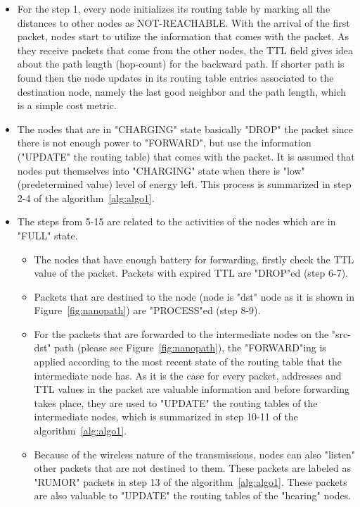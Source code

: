 \documentclass[12pt, oneandhalf, chaparabic, sees, ms]{metu}
\begin{document}
\newpage
\begin{itemize}
\setlength\itemsep{0em}
\item For the step 1, every node initializes its routing table by marking all the distances to other nodes as NOT-REACHABLE. With the arrival of the first packet, nodes start to utilize the information that comes with the packet. As they receive packets that come 
from the other nodes, the TTL field gives idea about the path length (hop-count) for the backward path. If shorter path is found then the node updates in its routing table entries associated to the destination node, namely the last good neighbor and the path length, which is a simple 
cost metric. 

\item The nodes that are in "CHARGING" state basically "DROP" the packet since there is not enough power to "FORWARD", but use the information ("UPDATE" the routing table) that comes with the packet. It is assumed that nodes put themselves into "CHARGING" state when there 
is "low" (predetermined value) level of energy left.
This process is summarized in step 2-4 of the algorithm~\ref{alg:algo1}. 

\item The steps from 5-15 are related to the activities of the nodes which are in "FULL" state.
\begin{itemize}
\setlength\itemsep{0em}
\item The nodes that have enough battery for forwarding, firstly check the TTL value of the packet. 
Packets with expired TTL are "DROP"ed (step 6-7). 

\item Packets that are destined to the node (node is "dst" node as it is shown in Figure~\ref{fig:nanopath}) are "PROCESS"ed (step 8-9). 

\item For the packets that are forwarded to the intermediate nodes on the "src-dst" path (please see Figure~\ref{fig:nanopath}), the "FORWARD"ing is applied according to the most recent state of the routing table that the intermediate node has. As it is the case for every packet, addresses and TTL values in the packet are valuable information and before forwarding takes place, they are used to "UPDATE" the routing tables of the 
intermediate nodes, which is summarized in step 10-11 of the algorithm~\ref{alg:algo1}. 

\item Because of the wireless nature of the transmissions, nodes can also "listen" other packets that are not destined to them. These packets are labeled as "RUMOR" packets in step 13 of the algorithm~\ref{alg:algo1}. These packets are also valuable to "UPDATE" the routing tables of the "hearing" nodes. 
\end{itemize}
\end{itemize}
\end{document}

